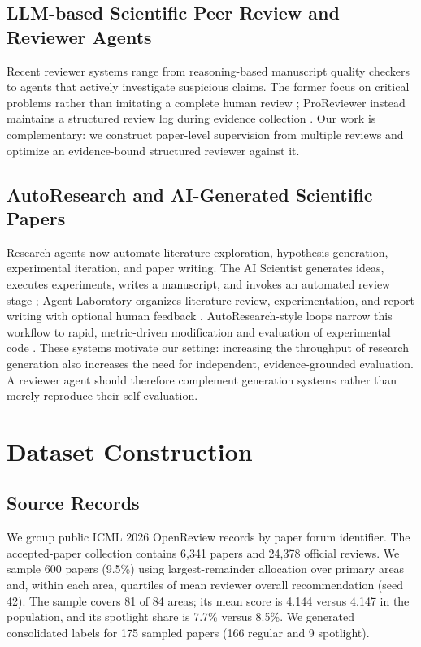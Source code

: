 \documentclass{article}
\begin{document}
\subsection{LLM-based Scientific Peer Review and Reviewer Agents}

Recent reviewer systems range from reasoning-based manuscript quality checkers to agents that actively investigate suspicious claims. The former focus on critical problems rather than imitating a complete human review \cite{zhang2025critical}; ProReviewer instead maintains a structured review log during evidence collection \cite{fang2026proreviewer}. Our work is complementary: we construct paper-level supervision from multiple reviews and optimize an evidence-bound structured reviewer against it.

\subsection{AutoResearch and AI-Generated Scientific Papers}

Research agents now automate literature exploration, hypothesis generation, experimental iteration, and paper writing. The AI Scientist generates ideas, executes experiments, writes a manuscript, and invokes an automated review stage \cite{lu2024aiscientist}; Agent Laboratory organizes literature review, experimentation, and report writing with optional human feedback \cite{schmidgall2025agentlab}. AutoResearch-style loops narrow this workflow to rapid, metric-driven modification and evaluation of experimental code \cite{karpathy2025autoresearch}. These systems motivate our setting: increasing the throughput of research generation also increases the need for independent, evidence-grounded evaluation. A reviewer agent should therefore complement generation systems rather than merely reproduce their self-evaluation.

\section{Dataset Construction}

\subsection{Source Records}

We group public ICML 2026 OpenReview records by paper forum identifier. The accepted-paper collection contains 6,341 papers and 24,378 official reviews. We sample 600 papers (9.5\%) using largest-remainder allocation over primary areas and, within each area, quartiles of mean reviewer overall recommendation (seed 42). The sample covers 81 of 84 areas; its mean score is 4.144 versus 4.147 in the population, and its spotlight share is 7.7\% versus 8.5\%. We generated consolidated labels for 175 sampled papers (166 regular and 9 spotlight).
\end{document}
